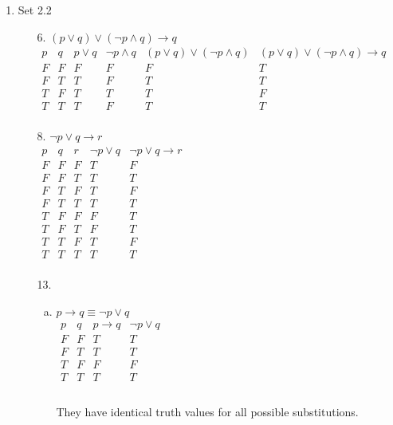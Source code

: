 \documentclass[letterpaper]{article}
\begin{document}
\begin{enumerate}
\begin{enumerate}
			\item Set 2.2
			\begin{itemize}
				\item [6.]
				$\left( p \vee q \right) \vee \left( \neg p \wedge q \right) \rightarrow q$ \\
				$\begin{array}{c|c|c|c|c|c}
					p & q & p \vee q & \neg p \wedge q & \left( p \vee q \right) \vee \left( \neg p \wedge q \right) &\left( p \vee q \right) \vee \left( \neg p \wedge q \right) \rightarrow q \\ \hline
					F & F & F & F & F & T \\ \hline
					F & T & T & F & T & T \\ \hline
					T & F & T & T & T & F \\ \hline
					T & T & T & F & T & T \\
				\end{array}$ \\
				
				\item [8.]
				$\neg p \vee q \rightarrow r$ \\
				$\begin{array}{c|c|c|c|c}
					p & q & r & \neg p \vee q & \neg p \vee q \rightarrow r \\ \hline
					F & F & F & T & F \\ \hline
					F & F & T & T & T \\ \hline
					F & T & F & T & F \\ \hline
					F & T & T & T & T \\ \hline
					T & F & F & F & T \\ \hline
					T & F & T & F & T \\ \hline
					T & T & F & T & F \\ \hline
					T & T & T & T & T \\ 
				\end{array}$ \\
			
				\item [13.] \quad
				\begin{enumerate}[(a)]
					\item
					$p \rightarrow q \equiv \neg p \vee q$ \\
					$\begin{array}{c|c|c|c}
						p & q & p \rightarrow q & \neg p \vee q \\ \hline
						F & F & T & T \\ \hline
						F & T & T & T \\ \hline
						T & F & F & F \\ \hline
						T & T & T & T \\
					\end{array}$ \\
					\\
					They have identical truth values for all possible substitutions.
					

\end{enumerate}
\end{itemize}
\end{enumerate}
\end{enumerate}
\end{document}
